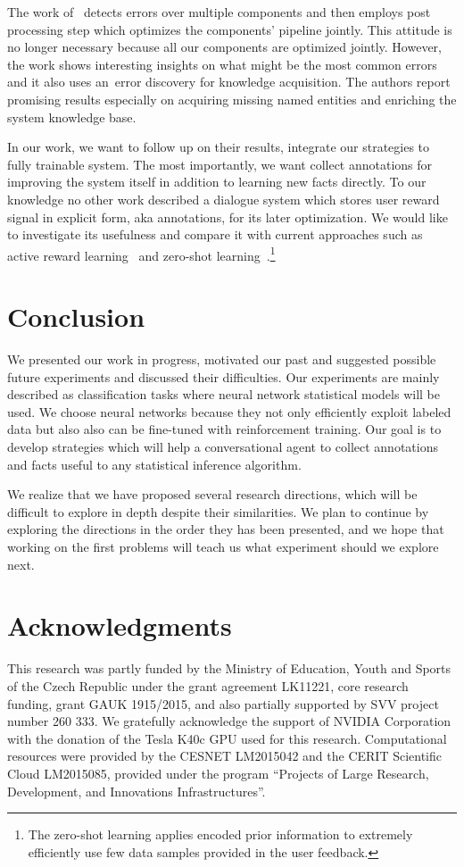\documentclass[11pt]{article}
\begin{document}
The work of~\cite{pappu_knowledge_2014} detects errors over multiple components and then employs post processing step which optimizes the components' pipeline jointly.
This attitude is no longer necessary because all our components are optimized jointly.
However, the work shows interesting insights on what might be the most common errors and it also uses an~error discovery for knowledge acquisition.
The authors report promising results especially on acquiring missing named entities and enriching the system knowledge base.

In our work, we want to follow up on their results, integrate our strategies to fully trainable system. 
The most importantly, we want collect annotations for improving the system itself in addition to learning new facts directly.
To our knowledge no other work described a dialogue system which stores user reward signal in explicit form, aka annotations, for its later optimization.
We would like to investigate its usefulness and compare it with current approaches such as active reward learning~\cite{su2016active} and zero-shot learning~\cite{vinyals_matching_2016}.\footnote{The zero-shot learning applies encoded prior information to extremely efficiently use few data samples provided in the user feedback.}


\section{Conclusion}
\label{sec:conclusion}
We presented our work in progress, motivated our past and suggested possible future experiments and discussed their difficulties.
Our experiments are mainly described as classification tasks where neural network statistical models will be used.
We choose neural networks because they not only efficiently exploit labeled data but also also can be fine-tuned with reinforcement training.
Our goal is to develop strategies which will help a conversational agent to collect annotations and facts useful to any statistical inference algorithm.

We realize that we have proposed several research directions, which will be difficult to explore in depth despite their similarities.
We plan to continue by exploring the directions in the order they has been presented, and we hope that working on the first problems will teach us what experiment should we explore next.

\section*{Acknowledgments}
This research was partly funded by the Ministry of Education, Youth and Sports of the Czech Republic under the grant agreement LK11221, core research funding, grant GAUK 1915/2015, and also partially supported by SVV project number 260 333. 
We gratefully acknowledge the support of NVIDIA Corporation with the donation of the Tesla K40c GPU used for this research.
Computational resources were provided by the CESNET LM2015042 and the CERIT Scientific Cloud LM2015085, provided under the program ``Projects of Large Research, Development, and Innovations Infrastructures''.



\end{document}
